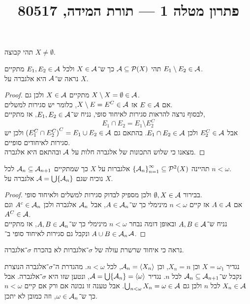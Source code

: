 
\title{פתרון מטלה 1 --- תורת המידה, 80517}


\maketitle
\maketitleprint[blue]

\question{}
תהי קבוצה $X \ne \emptyset$.

\subquestion{}
תהי $\mathcal{A} \subseteq \mathcal{P}(X)$ כך ש־$X \in \mathcal{A}$ ולכל $E_1, E_2 \in \mathcal{A}$ מתקיים $E_1 \setminus E_2 \in \mathcal{A}$. \\
נראה ש־$\mathcal{A}$ היא אלגברה על $X$.
\begin{proof}
	מתקיים $X \in \mathcal{A}$ ולכן גם $X \setminus X = \emptyset \in \mathcal{A}$. \\
	אם $E \in \mathcal{A}$ אז $X \setminus E = E^C \in \mathcal{A}$, כלומר יש סגירות למשלים. \\
	לבסוף נרצה להראות סגירות לאיחוד סופי, נניח ש־$E_1, E_2 \in \mathcal{A}$, אז מתקיים,
	\[
		E_1 \cap E_2
		= E_1 \setminus E_2^C
	\]
	אבל $E_2^C \in \mathcal{A}$ ולכן $E_1 \cap E_2 \in \mathcal{A}$.
	בהתאם גם ${(E_1^C \cap E_2^C)}^C = E_1 \cup E_2 \in \mathcal{A}$ ולכן יש סגירות לאיחודים סופיים. \\
	מצאנו כי שלוש התכונות של אלגברה חלות על $\mathcal{A}$ ובהתאם היא אלגברה.
\end{proof}

\subquestion{}
תהיינה ${\{ \mathcal{A}_n \}}_{n = 1}^{\infty} \subseteq \mathcal{P}^2(X)$ אלגברות על $X$ כך שמתקיים $\mathcal{A}_n \subseteq \mathcal{A}_{n + 1}$ לכל $n < \omega$. \\
נוכיח שגם $\mathcal{A} = \bigcup \{ \mathcal{A}_n \}$ אלגברה על $X$.
\begin{proof}
	בבירור $\emptyset, X \in \mathcal{A}$ ולכן מספיק לבדוק סגירות למשלים ולאיחוד סופי. \\
	אם $A \in \mathcal{A}$ אז קיים $n < \omega$ מינימלי כך ש־$A \in \mathcal{A}_n$, אבל $\mathcal{A}_n$ אלגברה ולכן $A^c \in \mathcal{A}_n$ וגם $A^C \in \mathcal{A}$. \\
	נניח ש־$A, B \in \mathcal{A}$ ובאופן דומה נבחר $n < \omega$ מינימלי כך ש־$A, B \in \mathcal{A}_n$, אז מתקיים $A \cup B \in \mathcal{A}_n$ ונקבל גם סגירות לאיחוד סופי ב־$\mathcal{A}$.
\end{proof}

\subquestion{}
נראה כי איחוד שרשרת עולה של $\sigma$־אלגברות לא בהכרח $\sigma$־אלגברה.
\begin{solution}
	נגדיר $X = \omega_1$ וכן $X_n = n$, וכן $\mathcal{A}_n = \langle X_n \rangle$, לכל $n < \omega$.
	מהגדרת ה־$\sigma$־אלגברה הנוצרת נקבל ש־$\mathcal{A}_n \subseteq \mathcal{A}_{n + 1}$ לכל $n$.
	נגדיר $\mathcal{A} = \bigcup \{ \mathcal{A}_n \} = \langle \omega \rangle$, ונטען שזו היא $\sigma$־אלגברה.
	אבל $X_n \in \mathcal{A}$ לכל $n$ ולכן גם $\bigcup_{n < \omega} X_n = \omega \in \mathcal{A}$.
	אבל טענה זו נכונה אם ורק אם קיים $n < \omega$ כך ש־$\omega \in \mathcal{A}_n$, וזה כמובן לא יתכן.
\end{solution}

